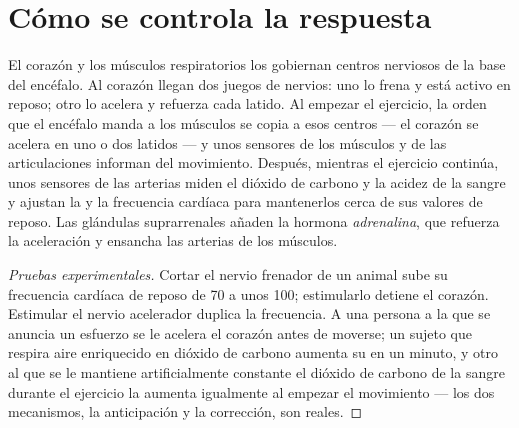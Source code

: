 \section{Cómo se controla la respuesta}

\begin{proposition}\label{prop:g10:heart-lungs-effort:control}
El corazón y los músculos respiratorios los gobiernan centros nerviosos
de la base del encéfalo. Al corazón llegan dos juegos de nervios: uno
lo frena y está activo en reposo; otro lo acelera y refuerza cada
latido. Al empezar el ejercicio, la orden que el encéfalo manda a los
músculos se copia a esos centros --- el corazón se acelera en uno o dos
latidos --- y unos sensores de los músculos y de las articulaciones
informan del movimiento. Después, mientras el ejercicio continúa, unos
sensores de las arterias miden el dióxido de carbono y la acidez de la
sangre y ajustan la  y la frecuencia cardíaca para
mantenerlos cerca de sus valores de reposo. Las glándulas suprarrenales
añaden la hormona \emph{adrenalina}, que refuerza la
aceleración y ensancha las arterias de los músculos.
\end{proposition}
\begin{proof}[Pruebas experimentales]
Cortar el nervio frenador de un animal sube su frecuencia cardíaca de
reposo de 70 a unos 100; estimularlo detiene el corazón. Estimular el
nervio acelerador duplica la frecuencia. A una persona a la que se
anuncia un esfuerzo se le acelera el corazón antes de moverse; un
sujeto que respira aire enriquecido en dióxido de carbono aumenta su
 en un minuto, y otro al que se le mantiene artificialmente
constante el dióxido de carbono de la sangre durante el ejercicio la
aumenta igualmente al empezar el movimiento --- los dos mecanismos, la
anticipación y la corrección, son reales.
\end{proof}

